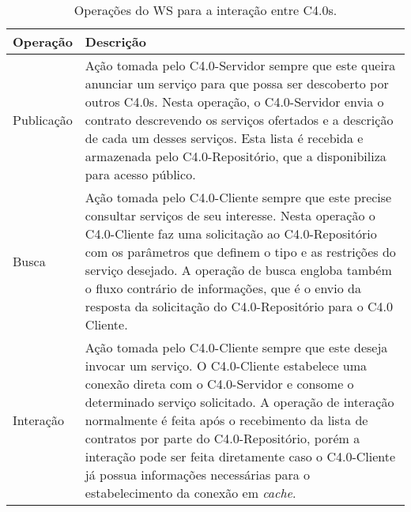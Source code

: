 \begin{table}[htb]
	\centering
	\caption{Operações do WS para a interação entre C4.0s.}
	\begin{tabular}{p{3cm}p{12cm}}
		\hline
		\textbf{Operação}
		 & \textbf{Descrição}                                                                                                                                                                                                                                                                                                                                                                                                                                                \\

		\hline
		Publicação
		 & Ação tomada pelo C4.0-Servidor sempre que este queira anunciar um serviço para que possa ser descoberto por outros C4.0s. Nesta operação, o C4.0-Servidor envia o contrato descrevendo os serviços ofertados e a descrição de cada um desses serviços. Esta lista é recebida e armazenada pelo C4.0-Repositório, que a disponibiliza para acesso público.                                                                                                         \\

		\hline
		Busca
		 & Ação tomada pelo C4.0-Cliente sempre que este precise consultar serviços de seu interesse. Nesta operação o C4.0-Cliente faz uma solicitação ao C4.0-Repositório com os parâmetros que definem o tipo e as restrições do serviço desejado. A operação de busca engloba também o fluxo contrário de informações, que é o envio da resposta da solicitação do C4.0-Repositório para o C4.0 Cliente.                                                                 \\

		\hline
		Interação
		 & Ação tomada pelo C4.0-Cliente sempre que este deseja invocar um serviço. O C4.0-Cliente estabelece uma conexão direta com o C4.0-Servidor e consome o determinado serviço solicitado. A operação de interação normalmente é feita após o recebimento da lista de contratos por parte do C4.0-Repositório, porém a interação pode ser feita diretamente caso o C4.0-Cliente já possua informações necessárias para o estabelecimento da conexão em \textit{cache}. \\

		\hline
	\end{tabular}

	\label{tab:operacoes-ws}
\end{table}

